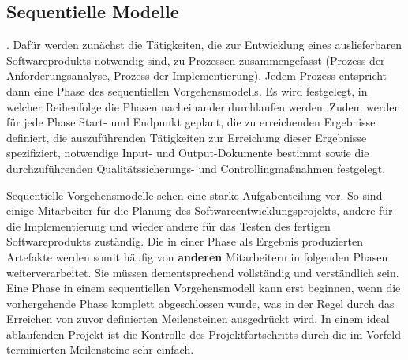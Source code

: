 \subsection{Sequentielle Modelle}
\label{sec:Kap-2.2.1}

\vspace{\baselineskip} %


. 
Dafür werden zunächst die Tätigkeiten, die zur Entwicklung eines auslieferbaren Softwareprodukts notwendig sind, zu Prozessen zusammengefasst (\zb Prozess der Anforderungsanalyse, Prozess der Implementierung). Jedem Prozess entspricht dann eine Phase des sequen\-tiel\-len Vorgehensmodells. Es wird festgelegt, in welcher Reihenfolge die Phasen nacheinander durchlaufen werden. Zudem werden für jede Phase Start- und Endpunkt geplant, die zu erreichenden Ergebnisse definiert, die auszuführenden Tätigkeiten zur Erreichung dieser Ergebnisse spezifiziert, notwendige Input- und Output-Dokumente bestimmt sowie die durchzuführenden Qualitätssicherungs- und Controllingmaßnahmen festgelegt. 

Sequentielle Vorgehensmodelle sehen eine starke Aufgabenteilung vor. So sind einige Mitarbeiter für die Planung des Softwareentwicklungsprojekts, andere für die Implementierung und wieder andere für das Testen des fertigen Softwareprodukts zuständig. Die in einer Phase als Ergebnis produzierten Artefakte werden somit häufig von \textbf{anderen} Mitarbeitern in folgenden Phasen weiterverarbeitet. Sie müssen dementsprechend vollständig und verständlich sein. Eine Phase in einem sequen\-tiel\-len Vorgehensmodell kann erst beginnen, wenn die vorhergehende Phase komplett abgeschlossen wurde, was in der Regel durch das Erreichen von zuvor definierten Meilensteinen ausgedrückt wird. In einem ideal ablaufenden Projekt ist die Kontrolle des Projektfortschritts durch die im Vorfeld terminierten Meilensteine sehr einfach. 

\vspace{\baselineskip} %


